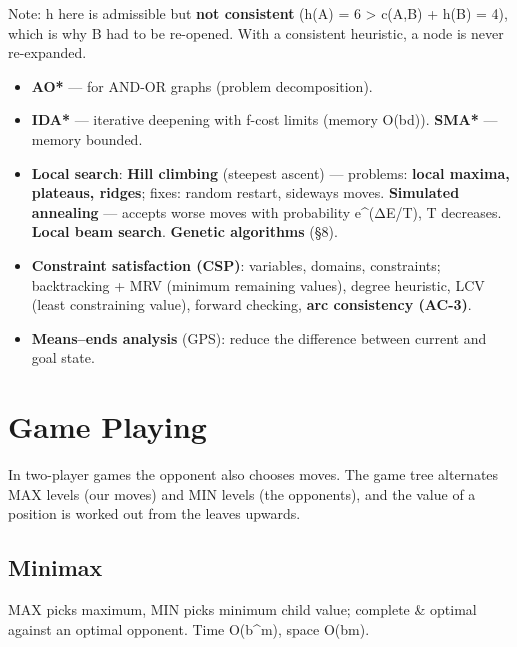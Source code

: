 \endgroup

Note: h here is admissible but \textbf{not consistent} (h(A) = 6 \textgreater{} c(A,B) + h(B) = 4), which is why B had to be re-opened.
With a consistent heuristic, a node is never re-expanded.

\begin{itemize}
\tightlist
\item
  \textbf{AO*} --- for AND-OR graphs (problem decomposition).
\item
  \textbf{IDA*} --- iterative deepening with f-cost limits (memory O(bd)). \textbf{SMA*} --- memory bounded.
\item
  \textbf{Local search}: \textbf{Hill climbing} (steepest ascent) --- problems: \textbf{local maxima, plateaus, ridges}; fixes: random restart, sideways moves. \textbf{Simulated annealing} --- accepts worse moves with probability e\^{}(ΔE/T), T decreases. \textbf{Local beam search}. \textbf{Genetic algorithms} (§8).
\item
  \textbf{Constraint satisfaction (CSP)}: variables, domains, constraints; backtracking + MRV (minimum remaining values), degree heuristic, LCV (least constraining value), forward checking, \textbf{arc consistency (AC-3)}.
\item
  \textbf{Means--ends analysis} (GPS): reduce the difference between current and goal state.
\end{itemize}

\needspace{227pt}

\hypertarget{p2-10--3-game-playing}{%
\section{Game Playing}\label{p2-10--3-game-playing}}

In two-player games the opponent also chooses moves. The game tree alternates MAX levels (our moves) and MIN levels
(the opponent\textquotesingle s), and the value of a position is worked out from the leaves upwards.

\needspace{191pt}

\hypertarget{p2-10--31-minimax}{%
\subsection{Minimax}\label{p2-10--31-minimax}}

MAX picks maximum, MIN picks minimum child value; complete \& optimal against an optimal opponent. Time O(b\^{}m), space O(bm).

